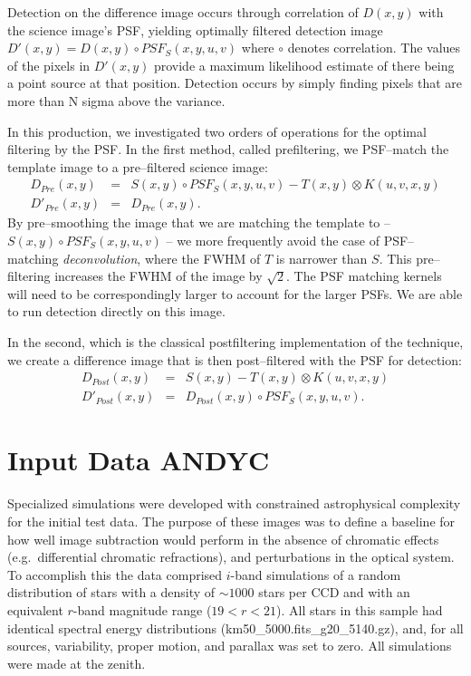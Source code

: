 \documentclass[prd, nofootinbib, floatfix, 11pt,tightenlines,times]{article}
\begin{document}
Detection on the difference image occurs through correlation of
$D(x,y)$ with the science image's PSF, yielding optimally filtered
detection image $D'(x,y) = D(x,y) \circ PSF_S(x,y,u,v)$ where $\circ$
denotes correlation.  The values of the pixels in $D'(x,y)$ provide a
maximum likelihood estimate of there being a point source at that
position.  Detection occurs by simply finding pixels that are more
than N sigma above the variance.  

In this production, we investigated two orders of operations for the
optimal filtering by the PSF.  In the first method, called
prefiltering, we PSF--match the template image to a pre--filtered
science image:
\begin{eqnarray}
D_{Pre}(x,y) & = & S(x,y) \circ PSF_S(x,y,u,v) - T(x,y) \otimes K(u,v,x,y) \nonumber \\ 
D'_{Pre}(x,y) & = & D_{Pre}(x,y). \nonumber 
\end{eqnarray}
By pre--smoothing the image that we are matching the template to --
$S(x,y) \circ PSF_S(x,y,u,v)$ -- we more frequently avoid the case
of PSF--matching {\it deconvolution}, where the FWHM of $T$ is
narrower than $S$.  This pre--filtering increases the FWHM of the
image by $\sqrt{2}$.  The PSF matching kernels will need to be
correspondingly larger to account for the larger PSFs.  We are able to
run detection directly on this image.

In the second, which is the classical postfiltering implementation of
the technique, we create a difference image that is then
post--filtered with the PSF for detection:
\begin{eqnarray}
D_{Post}(x,y) & = & S(x,y) - T(x,y) \otimes K(u,v,x,y) \nonumber \\ 
D'_{Post}(x,y) & = & D_{Post}(x,y) \circ PSF_S(x,y,u,v).  \nonumber 
\end{eqnarray}


\section{Input Data {\bf ANDYC}}

Specialized simulations were developed with constrained astrophysical
complexity for the initial test data. The purpose of these images was
to define a baseline for how well image subtraction would perform in
the absence of chromatic effects (e.g.\ differential chromatic
refractions), and perturbations in the optical system. To accomplish
this the data comprised $i$-band simulations of a random distribution
of stars with a density of $\sim 1000$ stars per CCD and with an
equivalent $r$-band magnitude range ($19<r<21$). All stars in this
sample had identical spectral energy distributions
(km50\_5000.fits\_g20\_5140.gz), and, for all sources, variability,
proper motion, and parallax was set to zero. All simulations were made
at the zenith.
\end{document}

